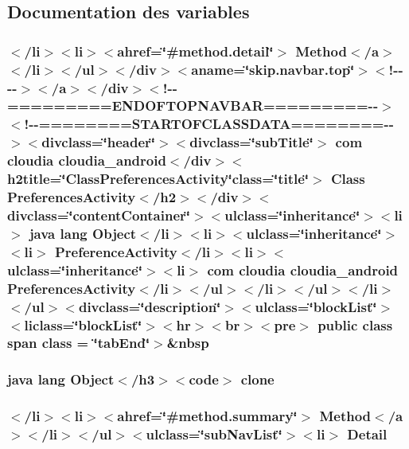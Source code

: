 \subsection{Documentation des variables}
\hypertarget{_preferences_activity_8html_a0c4f5c02745699c944b95d6313297f70}{
\subsubsection[{class}]{\setlength{\rightskip}{0pt plus 5cm}$<$/li$>$$<$li$>$$<$ahref=\char`\"{}\#method.\-detail\char`\"{}$>$ Method$<$/{\bf a}$>$$<$/li$>$$<$/ul$>$$<$/div$>$$<$aname=\char`\"{}skip.\-navbar.\-top\char`\"{}$>$$<$!-\/-\/-\/-\/$>$$<$/a$>$$<$/div$>$$<$!-\/-\/=========E\-N\-D\-O\-F\-T\-O\-P\-N\-A\-V\-B\-A\-R=========-\/-\/$>$$<$!-\/-\/========S\-T\-A\-R\-T\-O\-F\-C\-L\-A\-S\-S\-D\-A\-T\-A========-\/-\/$>$$<$divclass=\char`\"{}header\char`\"{}$>$$<$divclass=\char`\"{}sub\-Title\char`\"{}$>$ com cloudia cloudia\-\_\-android$<$/div$>$$<$h2title=\char`\"{}Class\-Preferences\-Activity\char`\"{}class=\char`\"{}title\char`\"{}$>$ Class {\bf Preferences\-Activity}$<$/h2$>$$<$/div$>$$<$divclass=\char`\"{}content\-Container\char`\"{}$>$$<$ulclass=\char`\"{}inheritance\char`\"{}$>$$<$li$>$ java lang Object$<$/li$>$$<$li$>$$<$ulclass=\char`\"{}inheritance\char`\"{}$>$$<$li$>$ Preference\-Activity$<$/li$>$$<$li$>$$<$ulclass=\char`\"{}inheritance\char`\"{}$>$$<$li$>$ com cloudia cloudia\-\_\-android {\bf Preferences\-Activity}$<$/li$>$$<$/ul$>$$<$/li$>$$<$/ul$>$$<$/li$>$$<$/ul$>$$<$divclass=\char`\"{}description\char`\"{}$>$$<$ulclass=\char`\"{}block\-List\char`\"{}$>$$<$liclass=\char`\"{}block\-List\char`\"{}$>$$<$hr$>$$<$br$>$$<$pre$>$ public class {\bf span} class = \char`\"{}tab\-End\char`\"{}$>$\&nbsp}}\label{_preferences_activity_8html_a0c4f5c02745699c944b95d6313297f70}
\hypertarget{_preferences_activity_8html_adc9607fcabf6f2d7f401ad52015ef6e0}{
\subsubsection[{clone}]{\setlength{\rightskip}{0pt plus 5cm}java lang Object$<$/h3$>$$<$code$>$ clone}}\label{_preferences_activity_8html_adc9607fcabf6f2d7f401ad52015ef6e0}
\hypertarget{_preferences_activity_8html_a1e04b5ec07bcd5281e26dcd40e5b3a94}{
\subsubsection[{Detail}]{\setlength{\rightskip}{0pt plus 5cm}$<$/li$>$$<$li$>$$<$ahref=\char`\"{}\#method.\-summary\char`\"{}$>$ Method$<$/{\bf a}$>$$<$/li$>$$<$/ul$>$$<$ulclass=\char`\"{}sub\-Nav\-List\char`\"{}$>$$<$li$>$ Detail}}\label{_preferences_activity_8html_a1e04b5ec07bcd5281e26dcd40e5b3a94}
